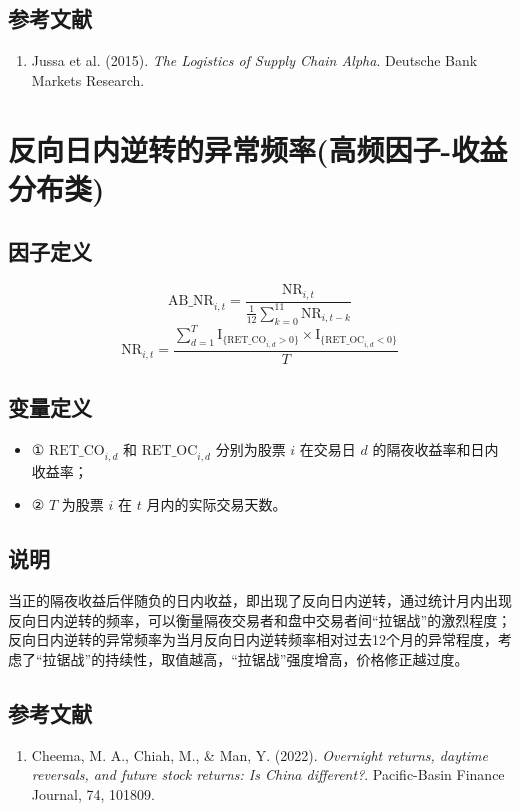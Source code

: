 \documentclass{article}
\begin{document}
\subsection{参考文献}
\begin{enumerate}
    \item Jussa et al. (2015). \textit{The Logistics of Supply Chain Alpha}. Deutsche Bank Markets Research.
\end{enumerate}

\section{反向日内逆转的异常频率(高频因子-收益分布类)}

\subsection{因子定义}

\begin{equation}
    \mathrm{AB\_NR}_{i,t} = \frac{\mathrm{NR}_{i,t}}{\frac{1}{12} \sum_{k=0}^{11} \mathrm{NR}_{i,t-k}}
\end{equation}
\begin{equation}
    \mathrm{NR}_{i,t} = \frac{\sum_{d=1}^{T} \mathrm{I}_{\{\mathrm{RET\_CO}_{i,d}>0\}} \times \mathrm{I}_{\{\mathrm{RET\_OC}_{i,d}<0\}}}{T}
\end{equation}

\subsection{变量定义}
\begin{itemize}
    \item ① \( \mathrm{RET\_CO}_{i,d} \) 和 \( \mathrm{RET\_OC}_{i,d} \) 分别为股票 \( i \) 在交易日 \( d \) 的隔夜收益率和日内收益率；
    \item ② \( T \) 为股票 \( i \) 在 \( t \) 月内的实际交易天数。
\end{itemize}

\subsection{说明}
当正的隔夜收益后伴随负的日内收益，即出现了反向日内逆转，通过统计月内出现反向日内逆转的频率，可以衡量隔夜交易者和盘中交易者间“拉锯战”的激烈程度；反向日内逆转的异常频率为当月反向日内逆转频率相对过去12个月的异常程度，考虑了“拉锯战”的持续性，取值越高，“拉锯战”强度增高，价格修正越过度。

\subsection{参考文献}
\begin{enumerate}
    \item Cheema, M. A., Chiah, M., \& Man, Y. (2022). \textit{Overnight returns, daytime reversals, and future stock returns: Is China different?}. Pacific-Basin Finance Journal, 74, 101809.
\end{enumerate}
\end{document}
